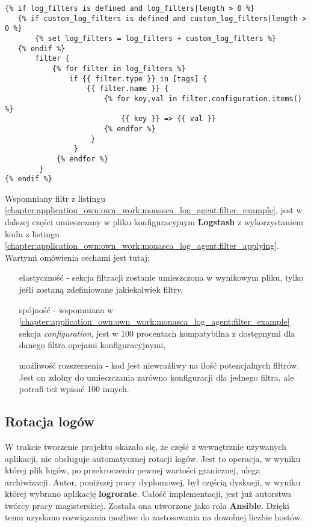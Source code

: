 \begin{listing}[H]
    \begin{verbatim}
{% if log_filters is defined and log_filters|length > 0 %}
   {% if custom_log_filters is defined and custom_log_filters|length > 0 %}
       {% set log_filters = log_filters + custom_log_filters %}
   {% endif %}
       filter {
           {% for filter in log_filters %}
               if {{ filter.type }} in [tags] {
                   {{ filter.name }} {
                       {% for key,val in filter.configuration.items() %}
                           {{ key }} => {{ val }}
                       {% endfor %}
                    }
                }
            {% endfor %}
        }
{% endif %}
    \end{verbatim}
    \label{chapter:application_own:own_work:monasca_log_agent:filter_applying}
    \caption[Wpisanie filtrów do pliku konfiguracyjnego \textbf{Logstash}]{
        Wpisanie filtrów do pliku konfiguracyjnego \textbf{Logstash}, źródło: \url{https://github.com/FujitsuEnablingSoftwareTechnologyGmbH/ansible-monasca-log-agent/blob/master/templates/agent.conf.j2}}
\end{listing}

Wspomniany filtr z listingu \ref{chapter:application_own:own_work:monasca_log_agent:filter_example}, jest w dalszej części umieszczany
w pliku konfiguracyjnym \textbf{Logstash} z wykorzystaniem kodu z listingu \ref{chapter:application_own:own_work:monasca_log_agent:filter_applying}. 
Wartymi omówienia cechami jest tutaj:
\begin{itemize}
    \item[elastyczność] - sekcja filtracji zostanie umieszczona w wynikowym pliku, tylko jeśli zostaną zdefiniowane jakiekolwiek filtry,
    \item[spójność] - wspomniana w \ref{chapter:application_own:own_work:monasca_log_agent:filter_example} sekcja \textit{configuration}, jest
    w 100 procentach kompatybilna z dostępnymi dla danego filtra opcjami konfiguracyjnymi,
    \item[możliwość rozszerzenia] - kod jest niewrażliwy na ilość potencjalnych filtrów. Jest on zdolny do umieszczania zarówno konfiguracji dla jednego
    filtra, ale potrafi też wpisać 100 innych. 
\end{itemize}

\subsection{Rotacja logów}
W trakcie tworzenie projektu okazało się, że część z wewnętrznie używanych aplikacji, nie obsługuje automatycznej rotacji logów. Jest
to operacja, w wyniku której plik logów, po przekroczeniu pewnej wartości granicznej, ulega archiwizacji. Autor, poniższej pracy dyplomowej,
był częścią dyskusji, w wyniku której wybrano aplikację \textbf{logrorate}. Całość implementacji, jest już autorstwa twórcy pracy magisterskiej.
Została ona utworzone jako rola \textbf{Ansible}. Dzięki temu uzyskano rozwiązania możliwe do zastosowania na dowolnej liczbie hostów.

